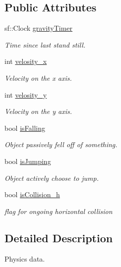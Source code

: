 \subsection*{Public Attributes}
\begin{DoxyCompactItemize}
\item 
sf\-::\-Clock \hyperlink{structDPhysics_1_1SPhysics_aee2f0f80a53a905eb9de32d3bb12e318}{gravity\-Timer}
\begin{DoxyCompactList}\small\item\em Time since last stand still. \end{DoxyCompactList}\item 
int \hyperlink{structDPhysics_1_1SPhysics_a2654e1fd65ea35fe4119c7866fd46274}{velosity\-\_\-x}
\begin{DoxyCompactList}\small\item\em Velocity on the x axis. \end{DoxyCompactList}\item 
int \hyperlink{structDPhysics_1_1SPhysics_a58c1f8fa61d0aeece450d7ab789c5013}{velosity\-\_\-y}
\begin{DoxyCompactList}\small\item\em Velocity on the y axis. \end{DoxyCompactList}\item 
bool \hyperlink{structDPhysics_1_1SPhysics_a39163a65d84fc6d7fd0be57560cffe12}{is\-Falling}
\begin{DoxyCompactList}\small\item\em Object passively fell off of something. \end{DoxyCompactList}\item 
bool \hyperlink{structDPhysics_1_1SPhysics_a6fc3e1a46d84fb6dec9f198bb6513856}{is\-Jumping}
\begin{DoxyCompactList}\small\item\em Object actively choose to jump. \end{DoxyCompactList}\item 
bool \hyperlink{structDPhysics_1_1SPhysics_a941f0fd89d53e7e7593217b81d04bf4b}{is\-Collision\-\_\-h}
\begin{DoxyCompactList}\small\item\em flag for ongoing horizontal collision \end{DoxyCompactList}\end{DoxyCompactItemize}


\subsection{Detailed Description}
Physics data. 

